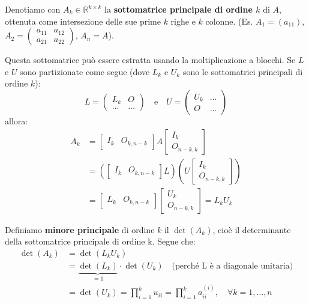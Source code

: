 Denotiamo con $A_k \in \mathbb{R}^{k \times k}$ la \textbf{sottomatrice principale di ordine $k$} di $A$, ottenuta come intersezione delle sue prime $k$ righe e $k$ colonne.
(Es. $A_1 = (a_{11})$, $A_2 = \begin{pmatrix} a_{11} & a_{12} \\ a_{21} & a_{22} \end{pmatrix}$, $A_n = A$).

\begin{osservazione}
Questa sottomatrice può essere estratta usando la moltiplicazione a blocchi. Se $L$ e $U$ sono partizionate come segue (dove $L_k$ e $U_k$ sono le sottomatrici principali di ordine $k$):
$$ L = \begin{pmatrix} L_k & O \\ \dots & \dots \end{pmatrix} \quad \text{e} \quad U = \begin{pmatrix} U_k & \dots \\ O & \dots \end{pmatrix} $$
allora:
\begin{align*}
    A_k &= \begin{bmatrix} I_k & O_{k, n-k} \end{bmatrix} A \begin{bmatrix} I_k \\ O_{n-k, k} \end{bmatrix} \\
        &= \left( \begin{bmatrix} I_k & O_{k, n-k} \end{bmatrix} L \right) \left( U \begin{bmatrix} I_k \\ O_{n-k, k} \end{bmatrix} \right) \\
        &= \begin{bmatrix} L_k & O_{k, n-k} \end{bmatrix} \begin{bmatrix} U_k \\ O_{n-k, k} \end{bmatrix} = L_k U_k
\end{align*}
\end{osservazione}
Definiamo \textbf{minore principale} di ordine $k$ il $\det(A_k)$, cioè il determinante della sottomatrice principale di ordine k.
Segue che:
\begin{align*}
    \det(A_k) &= \det(L_k U_k) \\
              &= \underbrace{\det(L_k)}_{=1} \cdot \det(U_k) \quad \text{(perché L è a diagonale unitaria)} \\
              &= \det(U_k) = \prod_{i=1}^k u_{ii} = \prod_{i=1}^k a_{ii}^{(i)}, \quad \forall k=1, \dots, n
\end{align*}
